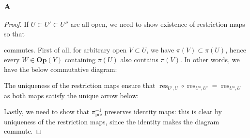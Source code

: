 \documentclass{article}
\newcommand{\id}{\mathrm{id}}
\newcommand{\fG}{\mathscr{G}}
\DeclareMathOperator{\pre}{pre}
\DeclareMathOperator{\res}{res}
\DeclareMathOperator{\colim}{colim}
\newcommand{\Op}{\mathbf{Op}} %
\begin{document}
\subsubsection{A}\label{2.7.A}
\begin{proof}
    If $U\subset U'\subset U''$ are all open, we need to show existence of restriction maps so that
    \begin{center}
    \end{center}
    commutes. First of all, for arbitrary open $V\subset U$, we have $\pi(V)\subset \pi(U)$, hence every $W\in \Op(Y)$ containing $\pi(U)$ also contains $\pi(V)$. In other words, we have the below commutative diagram:
    \begin{center}
    \end{center}
    The uniqueness of the restriction maps ensure that $\res_{U',U} \circ \res_{U'',U'} = \res_{U'',U}$ as both maps satisfy the unique arrow below:
    \begin{center}
    \end{center}
    Lastly, we need to show that $\pi^{-1}_{\pre}$ preserves identity maps: this is clear by uniqueness of the restriction maps, since the identity makes the diagram commute.


\end{proof}
\end{document}
